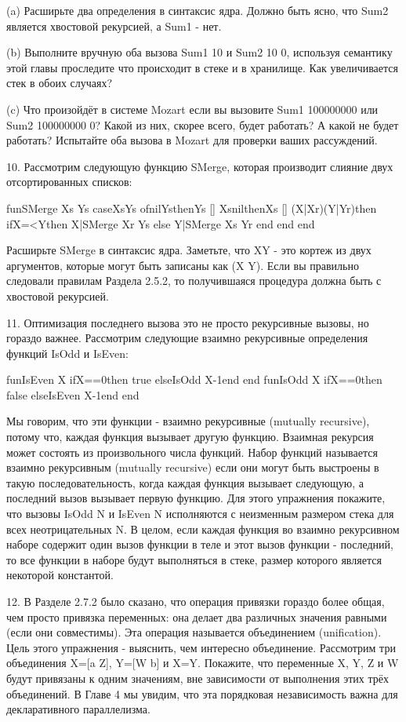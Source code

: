 (a) Расширьте два определения в синтаксис ядра. Должно быть ясно, что Sum2 является хвостовой рекурсией, а Sum1 - нет.

(b) Выполните вручную оба вызова {Sum1 10} и {Sum2 10 0}, используя семантику этой главы проследите что происходит в стеке и в хранилище. Как увеличивается стек в обоих случаях?

(c) Что произойдёт в системе Mozart если вы вызовите {Sum1 100000000} или {Sum2 100000000 0}? Какой из них, скорее всего, будет работать? А какой не будет работать? Испытайте оба вызова в Mozart для проверки ваших рассуждений.

10. Рассмотрим следующую функцию SMerge, которая производит слияние двух отсортированных списков:

fun{SMerge Xs Ys}
caseXsYs
ofnilYsthenYs
[] XsnilthenXs
[] (X|Xr)(Y|Yr)then
ifX=<Ythen
X|{SMerge Xr Ys}
else
Y|{SMerge Xs Yr}
end
end
end

Расширьте SMerge в синтаксис ядра. Заметьте, что XY - это кортеж из двух аргументов, которые могут быть записаны как  (X Y). Если вы правильно следовали правилам Раздела 2.5.2, то получившаяся процедура должна быть с хвостовой рекурсией.

11. Оптимизация последнего вызова это не просто рекурсивные вызовы, но гораздо важнее. Рассмотрим следующие взаимно рекурсивные определения функций IsOdd и IsEven:

fun{IsEven X}
ifX==0then true else{IsOdd X-1}end
end
fun{IsOdd X}
ifX==0then false else{IsEven X-1}end
end

Мы говорим, что эти функции - взаимно рекурсивные (mutually recursive), потому что, каждая функция вызывает другую функцию. Взаимная рекурсия может состоять из произвольного числа функций. Набор функций называется взаимно рекурсивным (mutually recursive) если они могут быть выстроены в такую последовательность, когда каждая функция вызывает следующую, а последний вызов вызывает первую функцию. Для этого упражнения покажите, что вызовы {IsOdd N} и {IsEven N} исполняются с неизменным размером стека для всех неотрицательных N. В целом, если каждая функция во взаимно рекурсивном наборе содержит один вызов функции в теле и этот вызов функции - последний, то все функции в наборе будут выполняться в стеке, размер которого является некоторой константой.

12. В Разделе 2.7.2 было сказано, что операция привязки гораздо более общая, чем просто привязка переменных: она делает два различных значения равными (если они совместимы). Эта операция называется объединением (unification). Цель этого упражнения - выяснить, чем интересно объединение. Рассмотрим три объединения X=[a Z], Y=[W b] и X=Y. Покажите, что переменные X, Y, Z и W будут привязаны к одним значениям, вне зависимости от выполнения этих трёх объединений. В Главе 4 мы увидим, что эта порядковая независимость важна для декларативного параллелизма.
